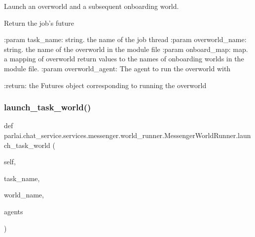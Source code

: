 \begin{DoxyVerb}Launch an overworld and a subsequent onboarding world.

Return the job's future

:param task_name:
    string. the name of the job thread
:param overworld_name:
    string. the name of the overworld in the module file
:param onboard_map:
    map. a mapping of overworld return values to the names
    of onboarding worlds in the module file.
:param overworld_agent:
    The agent to run the overworld with

:return:
    the Futures object corresponding to running the overworld
\end{DoxyVerb}
 \mbox{\label{classparlai_1_1chat__service_1_1services_1_1messenger_1_1world__runner_1_1MessengerWorldRunner_a45a5944b8a5a786163c3e1ceb9437b15}} 
\subsubsection{\texorpdfstring{launch\+\_\+task\+\_\+world()}{launch\_task\_world()}}
{\footnotesize\ttfamily def parlai.\+chat\+\_\+service.\+services.\+messenger.\+world\+\_\+runner.\+Messenger\+World\+Runner.\+launch\+\_\+task\+\_\+world (\begin{DoxyParamCaption}\item[{}]{self,  }\item[{}]{task\+\_\+name,  }\item[{}]{world\+\_\+name,  }\item[{}]{agents }\end{DoxyParamCaption})}

